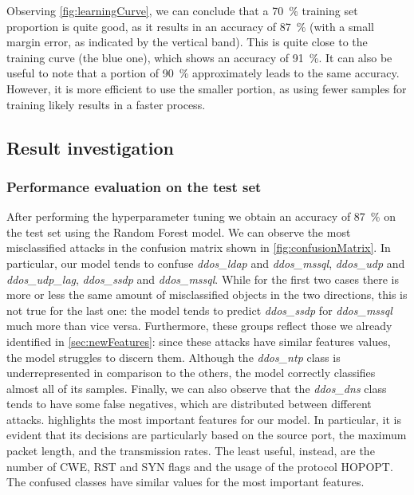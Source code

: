 \documentclass[acmlarge,nonacm]{acmart}
\begin{document}
Observing \cref{fig:learningCurve}, we can conclude that a \SI{70}{\percent} training set proportion is quite good, as it results in an accuracy of \SI{87}{\percent} (with a small margin error, as indicated by the vertical band). This is quite close to the training curve (the blue one), which shows an accuracy of \SI{91}{\percent}. It can also be useful to note that a portion of \SI{90}{\percent} approximately leads to the same accuracy. However, it is more efficient to use the smaller portion, as using fewer samples for training likely results in a faster process.

\subsection{Result investigation}\label{sec:resultInvestigation}
\subsubsection{Performance evaluation on the test set} 
After performing the hyperparameter tuning we obtain an accuracy of \SI{87}{\percent} on the test set using the Random Forest model. We can observe the most misclassified attacks in the confusion matrix shown in \cref{fig:confusionMatrix}. In particular, our model tends to confuse \emph{ddos\_ldap} and \emph{ddos\_mssql}, \emph{ddos\_udp} and \emph{ddos\_udp\_lag}, \emph{ddos\_ssdp} and \emph{ddos\_mssql}. While for the first two cases there is more or less the same amount of misclassified objects in the two directions, this is not true for the last one: the model tends to predict \emph{ddos\_ssdp} for \emph{ddos\_mssql} much more than vice versa. Furthermore, these groups reflect those we already identified in \cref{sec:newFeatures}: since these attacks have similar features values, the model struggles to discern them. Although the \emph{ddos\_ntp} class is underrepresented in comparison to the others, the model correctly classifies almost all of its samples. Finally, we can also observe that the \emph{ddos\_dns} class tends to have some false negatives, which are distributed between different attacks.  highlights the most important features for our model. In particular, it is evident that its decisions are particularly based on the source port, the maximum packet length, and the transmission rates. The least useful, instead, are the number of CWE, RST and SYN flags and the usage of the protocol HOPOPT. The confused classes have similar values for the most important features. 
\end{document}
